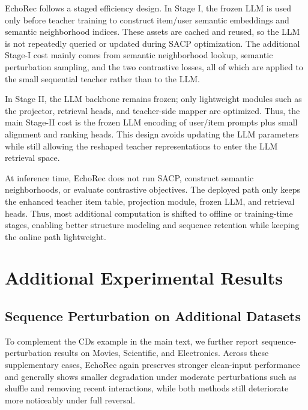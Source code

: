 ﻿\documentclass{article}
\begin{document}
EchoRec follows a staged efficiency design. In Stage I, the frozen LLM is used only before teacher training to construct item/user semantic embeddings and semantic neighborhood indices. These assets are cached and reused, so the LLM is not repeatedly queried or updated during SACP optimization. The additional Stage-I cost mainly comes from semantic neighborhood lookup, semantic perturbation sampling, and the two contrastive losses, all of which are applied to the small sequential teacher rather than to the LLM.

In Stage II, the LLM backbone remains frozen; only lightweight modules such as the projector, retrieval heads, and teacher-side mapper are optimized. Thus, the main Stage-II cost is the frozen LLM encoding of user/item prompts plus small alignment and ranking heads. This design avoids updating the LLM parameters while still allowing the reshaped teacher representations to enter the LLM retrieval space.

At inference time, EchoRec does not run SACP, construct semantic neighborhoods, or evaluate contrastive objectives. The deployed path only keeps the enhanced teacher item table, projection module, frozen LLM, and retrieval heads. Thus, most additional computation is shifted to offline or training-time stages, enabling better structure modeling and sequence retention while keeping the online path lightweight.

\section{Additional Experimental Results}
\label{app:extra_results}

\subsection{Sequence Perturbation on Additional Datasets}
\label{app:seq_perturb_scientific}

To complement the CDs example in the main text, we further report sequence-perturbation results on Movies, Scientific, and Electronics. Across these supplementary cases, EchoRec again preserves stronger clean-input performance and generally shows smaller degradation under moderate perturbations such as shuffle and removing recent interactions, while both methods still deteriorate more noticeably under full reversal.
\end{document}
